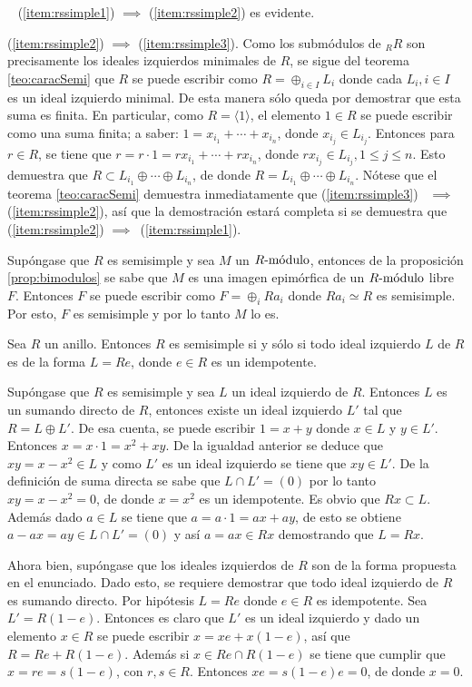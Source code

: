 \begin{proof*}~\newline
\indent (\ref{item:rssimple1}) $\implies$ (\ref{item:rssimple2}) es evidente.

(\ref{item:rssimple2}) $\implies$ (\ref{item:rssimple3}). Como los submódulos de $_RR$ son precisamente los ideales izquierdos minimales de $R$, se sigue del teorema \ref{teo:caracSemi} que $R$ se puede escribir como $R = \oplus_{i \in I}L_i$ donde cada $L_i, i \in I$ es un ideal izquierdo minimal. De esta manera sólo queda por demostrar que esta suma es finita.
En particular, como $R = \langle 1 \rangle$, el elemento $1 \in R$ se puede escribir como una suma finita; a saber: $1 = x_{i_1} + \cdots + x_{i_n}$, donde $x_{i_j} \in L_{i_j}$. Entonces para $r \in R$, se tiene que $r = r \cdot 1 = rx_{i_1} + \cdots +rx_{i_n}$, donde $rx_{i_j} \in L_{i_j}, 1\leq j \leq n$. Esto demuestra que $R \subset L_{i_1} \oplus \cdots \oplus L_{i_n}$, de donde $R = L_{i_1} \oplus \cdots \oplus L_{i_n}$.
Nótese que el teorema \ref{teo:caracSemi} demuestra inmediatamente que (\ref{item:rssimple3})~ $\implies$(\ref{item:rssimple2}), así que la demostración estará completa si se demuestra que (\ref{item:rssimple2}) $\implies$~(\ref{item:rssimple1}). 

Supóngase que $R$ es semisimple y sea $M$ un $\modulo{R}$, entonces de la proposición \ref{prop:bimodulos} se sabe que $M$ es una imagen epimórfica de un $\modulo{R}$ libre $F$. Entonces $F$ se puede escribir como $F = \oplus_{i}Ra_i$ donde $Ra_i \simeq R$ es semisimple. Por esto, $F$ es semisimple y por lo tanto $M$ lo es. 
\end{proof*}
\begin{teorema}\label{teo:idealIdem}
Sea $R$ un anillo. Entonces $R$ es semisimple si y sólo si todo ideal izquierdo $L$ de $R$ es de la forma $L = Re$, donde $e \in R$ es un idempotente.
\end{teorema}
\begin{proof*}
Supóngase que $R$ es semisimple y sea $L$ un ideal  izquierdo de $R$. Entonces $L$ es un sumando directo de $R$, entonces existe un ideal izquierdo $L'$ tal que $R = L \oplus L'$. De esa cuenta, se puede escribir $1 = x + y$ donde $x \in L$ y $y \in L'$. Entonces $x = x \cdot 1 = x^2 + xy$. De la igualdad anterior se deduce que $xy = x - x^2 \in L$ y como $L'$ es un ideal izquierdo se tiene que $xy \in L'$. De la definición de suma directa se sabe que $L \cap L' = (0)$ por lo tanto $xy = x - x^2 = 0$, de donde $x = x^2$ es un idempotente. Es obvio que $Rx \subset L$. Además dado $a  \in L$ se tiene que $a = a \cdot 1 = ax + ay$, de esto se obtiene $a -ax = ay\in L\cap L'=(0)$ y así $a = ax \in Rx$ demostrando que $L = Rx$. 

Ahora bien, supóngase que los ideales izquierdos de $R$ son de la forma propuesta en el enunciado. Dado esto, se requiere demostrar que todo ideal izquierdo de $R$ es sumando directo. Por hipótesis $L = Re$ donde $e \in R$ es idempotente. Sea $L'= R(1-e)$. Entonces es claro que $L'$ es un ideal izquierdo y dado un elemento $x \in R$ se puede escribir $x = xe + x(1-e)$, así que $R = Re + R(1-e)$. Además si $x \in Re \cap R(1-e)$ se tiene que cumplir que $x = re = s(1-e)$, con $r,s \in R$. Entonces $xe = s(1-e)e = 0$, de donde $x = 0$.  
\end{proof*}
